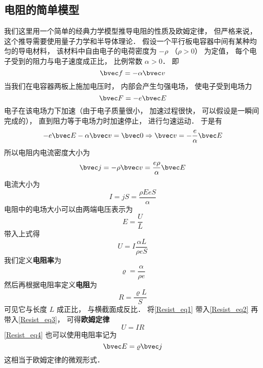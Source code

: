 \subsection{电阻的简单模型}
我们这里用一个简单的经典力学模型推导电阻的性质及欧姆定律， 但严格来说， 这个推导需要使用量子力学和半导体理论． 假设一个平行板电容器中间有某种均匀的导电材料， 该材料中自由电子的电荷密度为 $-\rho$ （$\rho > 0$） 为定值， 每个电子受到的阻力与电子速度成正比， 比例常数 $\alpha > 0$． 即
\begin{equation}
\bvec f = -\alpha \bvec v
\end{equation}
当我们在电容器两板上施加电压时， 内部会产生匀强电场， 使电子受到电场力
\begin{equation}
\bvec F = -e\bvec E
\end{equation}
电子在该电场力下加速（由于电子质量很小， 加速过程很快， 可以假设是一瞬间完成的）， 直到阻力等于电场力时加速停止， 进行匀速运动． 于是有
\begin{equation}
-e\bvec E - \alpha \bvec v = \bvec 0 \Rightarrow \bvec v = -\frac{e}{\alpha}\bvec E
\end{equation}
所以电阻内电流密度大小为
\begin{equation}\label{Resist_eq4}
\bvec j = -\rho \bvec v = \frac{e\rho}{\alpha}\bvec E
\end{equation}
电流大小为
\begin{equation}
I = jS = \frac{\rho EeS}{\alpha}
\end{equation}
电阻中的电场大小可以由两端电压表示为
\begin{equation}
E = \frac UL
\end{equation}
带入上式得
\begin{equation}\label{Resist_eq3}
U = I \frac{\alpha L}{\rho eS}
\end{equation}
我们定义\textbf{电阻率}为
\begin{equation}\label{Resist_eq1}
\varrho = \frac{\alpha}{\rho e}
\end{equation}
然后再根据电阻率定义\textbf{电阻}为
\begin{equation}\label{Resist_eq2}
R = \frac{\varrho L}{S}
\end{equation}
可见它与长度 $L$ 成正比， 与横截面成反比． 将\autoref{Resist_eq1} 带入\autoref{Resist_eq2} 再带入\autoref{Resist_eq3}， 可得\textbf{欧姆定律}
\begin{equation}
U = IR
\end{equation}
\autoref{Resist_eq4} 也可以使用电阻率记为
\begin{equation}
\bvec E = \varrho\bvec j
\end{equation}
这相当于欧姆定律的微观形式．
